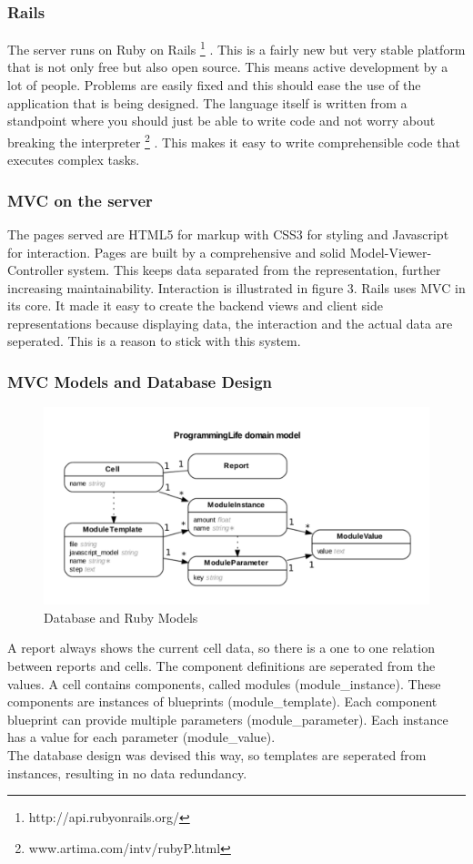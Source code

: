 \documentclass{report}
\begin{document}
				\subsubsection{Rails}
					The server runs on Ruby on Rails \footnote{http://api.rubyonrails.org/} . This is a fairly new but very stable platform that is not only free but also open source. This means active development by a lot of people. Problems are easily fixed and this should ease the use of the application that is being designed. The language itself is written from a standpoint where you should just be able to write code and not worry about breaking the interpreter \footnote{www.artima.com/intv/rubyP.html} . This makes it easy to write comprehensible code that executes complex tasks.				
				\subsubsection{MVC on the server}
					The pages served are HTML5 for markup with CSS3 for styling and Javascript for interaction. Pages are built by a comprehensive and solid Model-Viewer-Controller system. This keeps data separated from the representation, further increasing maintainability. Interaction is illustrated in figure 3. Rails uses MVC in its core. It made it easy to create the backend views and client side representations because displaying data, the interaction and the actual data are seperated. This is a reason to stick with this system.
				\subsubsection{MVC Models and Database Design}
					\begin{figure}[htb]
						\begin{center}
							\includegraphics[scale=0.4]{erd.pdf}
							\caption{Database and Ruby Models}
							\label{fig: erd}
						\end{center}
					\end{figure}	
					A report always shows the current cell data, so there is a one to one relation between reports and cells. The component definitions are seperated from the values. A cell contains components, called modules (module_instance). These components are instances of blueprints (module_template). Each component blueprint can provide multiple parameters (module_parameter). Each instance has a value for each parameter (module_value).\\
					The database design was devised this way, so templates are seperated from instances, resulting in no data redundancy.
\end{document}
